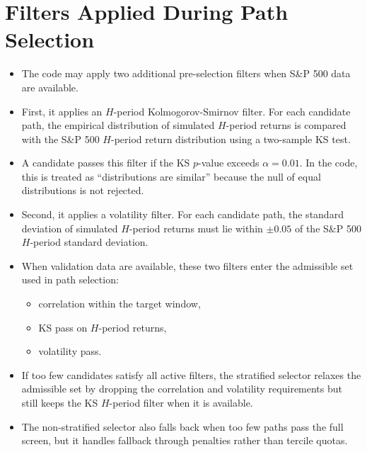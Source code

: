 \documentclass[11pt]{article}
\begin{document}
\section*{Filters Applied During Path Selection}
\begin{itemize}
\item The code may apply two additional pre-selection filters when S\&P 500 data are available.
\item First, it applies an \(H\)-period Kolmogorov-Smirnov filter. For each candidate path, the empirical distribution of simulated \(H\)-period returns is compared with the S\&P 500 \(H\)-period return distribution using a two-sample KS test.
\item A candidate passes this filter if the KS \(p\)-value exceeds \(\alpha = 0.01\). In the code, this is treated as ``distributions are similar'' because the null of equal distributions is not rejected.
\item Second, it applies a volatility filter. For each candidate path, the standard deviation of simulated \(H\)-period returns must lie within \(\pm 0.05\) of the S\&P 500 \(H\)-period standard deviation.
\item When validation data are available, these two filters enter the admissible set used in path selection:
\begin{itemize}
\item correlation within the target window,
\item KS pass on \(H\)-period returns,
\item volatility pass.
\end{itemize}
\item If too few candidates satisfy all active filters, the stratified selector relaxes the admissible set by dropping the correlation and volatility requirements but still keeps the KS \(H\)-period filter when it is available.
\item The non-stratified selector also falls back when too few paths pass the full screen, but it handles fallback through penalties rather than tercile quotas.
\end{itemize}
\end{document}
